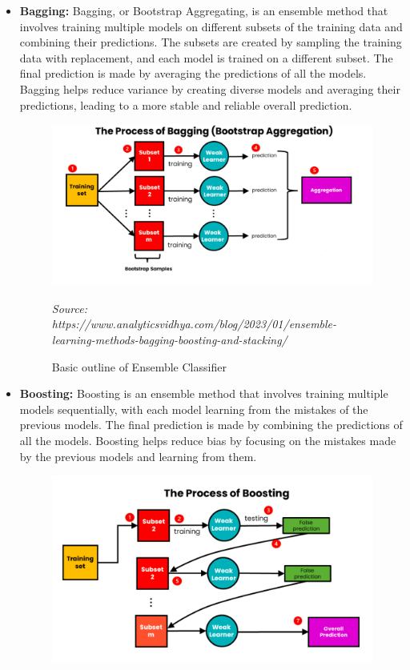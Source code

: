 \begin{itemize}[noitemsep]
    \item \textbf{Bagging:} Bagging, or Bootstrap Aggregating, is an ensemble method that involves training multiple models on different subsets of the training data and combining their predictions. The subsets are created by sampling the training data with replacement, and each model is trained on a different subset. The final prediction is made by averaging the predictions of all the models. Bagging helps reduce variance by creating diverse models and averaging their predictions, leading to a more stable and reliable overall prediction.
    \begin{figure}[H]
        \centering
        \includegraphics[width=120mm]{./img/bagging.jpg}
        \caption*{\small{\textit{Source: https://www.analyticsvidhya.com/blog/2023/01/ensemble-learning-methods-bagging-boosting-and-stacking/}}}
        \caption{Basic outline of Ensemble Classifier}
    \end{figure}
    \clearpage
    \item \textbf{Boosting:} Boosting is an ensemble method that involves training multiple models sequentially, with each model learning from the mistakes of the previous models. The final prediction is made by combining the predictions of all the models. Boosting helps reduce bias by focusing on the mistakes made by the previous models and learning from them.
    \begin{figure}[H]
        \centering
        \includegraphics[width=120mm]{./img/boosting.png}

\end{figure}
\end{itemize}
